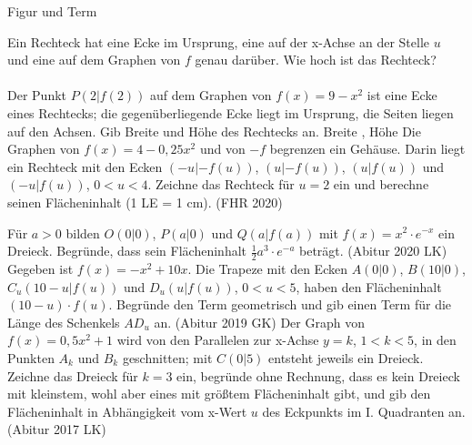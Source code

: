 \setcounter{aufgabe}{8}

\begin{aufgabe}{Figur und Term}
\begin{teile}
\teil Ein Rechteck hat eine Ecke im Ursprung, eine auf der x-Achse an der Stelle $u$ und eine auf dem Graphen von $f$ genau darüber. Wie hoch ist das Rechteck?  \\  \\ 
\teil Der Punkt $P(2 | f(2))$ auf dem Graphen von $f(x) = 9 - x^2$ ist eine Ecke eines Rechtecks; die gegenüberliegende Ecke liegt im Ursprung, die Seiten liegen auf den Achsen. Gib Breite und Höhe des Rechtecks an. Breite \leerfeld , Höhe \leerfeld
\teil Die Graphen von $f(x) = 4 - 0{,}25x^2$ und von $-f$ begrenzen ein Gehäuse. Darin liegt ein Rechteck mit den Ecken $(-u | -f(u))$, $(u | -f(u))$, $(u | f(u))$ und $(-u | f(u))$, $0 < u < 4$. Zeichne das Rechteck für $u = 2$ ein und berechne seinen Flächeninhalt (1 LE = 1 cm). \hfill (FHR 2020)

\begin{ksys}[xmin=-5,xmax=5,ymin=-5,ymax=5]   \end{ksys}
\teil Für $a > 0$ bilden $O(0 | 0)$, $P(a | 0)$ und $Q(a | f(a))$ mit $f(x) = x^2 \cdot e^{-x}$ ein Dreieck. Begründe, dass sein Flächeninhalt $\tfrac{1}{2} a^3 \cdot e^{-a}$ beträgt. \hfill (Abitur 2020 LK)
\teil Gegeben ist $f(x) = -x^2 + 10x$. Die Trapeze mit den Ecken $A(0 | 0)$, $B(10 | 0)$, $C_u(10 - u | f(u))$ und $D_u(u | f(u))$, $0 < u < 5$, haben den Flächeninhalt $(10 - u) \cdot f(u)$. Begründe den Term geometrisch und gib einen Term für die Länge des Schenkels $AD_u$ an. \hfill (Abitur 2019 GK)
\teil Der Graph von $f(x) = 0{,}5x^2 + 1$ wird von den Parallelen zur x-Achse $y = k$, $1 < k < 5$, in den Punkten $A_k$ und $B_k$ geschnitten; mit $C(0 | 5)$ entsteht jeweils ein Dreieck. Zeichne das Dreieck für $k = 3$ ein, begründe ohne Rechnung, dass es kein Dreieck mit kleinstem, wohl aber eines mit größtem Flächeninhalt gibt, und gib den Flächeninhalt in Abhängigkeit vom x-Wert $u$ des Eckpunkts im I. Quadranten an. \hfill (Abitur 2017 LK)

\begin{ksys}[xmin=-4,xmax=4,ymin=-1,ymax=6]  \end{ksys}
\end{teile}
\end{aufgabe}

